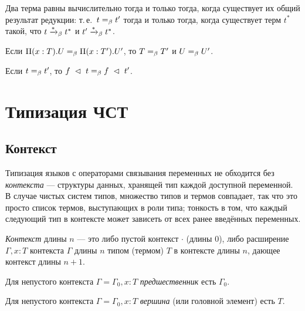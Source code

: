 \begin{theorem}
Два терма равны вычислительно тогда и только тогда,
когда существует их общий результат редукции:
т.\,е.~$t =_{\beta} t'$ тогда и только тогда, когда
существует терм $t^*$ такой, что $t \xrightarrow{*}_{\beta} t^*$ и
$t' \xrightarrow{*}_{\beta} t^*$.
\end{theorem}

\begin{lemma}
Если $\Pi(x:T).U =_{\beta} \Pi(x:T').U'$, то
$T =_{\beta} T'$ и $U =_{\beta} U'$.
\end{lemma}

\begin{lemma}
Если $t =_{\beta} t'$, то
$f\;\vartriangleleft\;t =_{\beta} f\;\vartriangleleft\;t'$.
\end{lemma}

\section{Типизация ЧСТ}

\subsection{Контекст}

Типизация языков с операторами связывания переменных не
обходится без \textit{контекста} --- структуры данных,
хранящей тип каждой доступной переменной. В случае
чистых систем типов, множество типов и термов
совпадает, так что это просто список термов,
выступающих в роли типа; тонкость в том, что каждый
следующий тип в контексте может зависеть от всех ранее
введённых переменных.

\begin{definition}[Контексты]
\emph{Контекст} длины $n$ --- это либо пустой контекст
$\cdot$ (длины $0$), либо расширение $\Gamma, x:T$
контекста $\Gamma$ длины $n$ типом (термом) $T$ в
контексте длины $n$, дающее контекст длины $n+1$.
\end{definition}

\begin{definition}
Для непустого контекста $\Gamma = \Gamma_0,x:T$
\emph{предшественник} есть $\Gamma_0$.
\end{definition}

\begin{definition}
Для непустого контекста $\Gamma = \Gamma_0,x:T$
\emph{вершина} (или головной элемент) есть $T$.
\end{definition}

